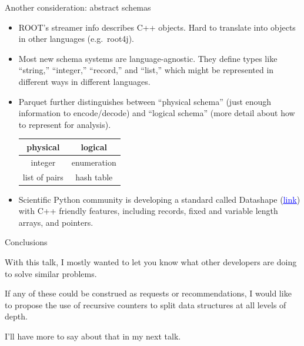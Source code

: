 \documentclass{beamer}
\begin{document}
\begin{frame}{Another consideration: abstract schemas}
\vspace{0.5 cm}
\begin{itemize}\setlength{\itemsep}{0.3 cm}
\item ROOT's streamer info describes C++ objects. Hard to translate into objects in other languages (e.g.\ root4j).

\item<2-> Most new schema systems are language-agnostic. They define types like ``string,'' ``integer,'' ``record,'' and ``list,'' which might be represented in different ways in different languages.

\item<3-> Parquet further distinguishes between ``physical schema'' (just enough information to encode/decode) and ``logical schema'' (more detail about how to represent for analysis).
\begin{center}
\begin{tabular}{c c}
physical & logical \\\hline
integer & enumeration \\
list of pairs & hash table \\
\end{tabular}
\end{center}

\item<4-> Scientific Python community is developing a standard called Datashape (\href{http://datashape.readthedocs.io/en/latest/overview.html}{\textcolor{blue}{\underline{link}}}) with C++ friendly features, including records, fixed and variable length arrays, and pointers.
\end{itemize}
\end{frame}

\begin{frame}{Conclusions}
\begin{block}{}
With this talk, I mostly wanted to let you know what other developers are doing to solve similar problems.
\end{block}

\begin{block}{}
If any of these could be construed as requests or recommendations, I would like to propose the use of recursive counters to split data structures at all levels of depth.
\end{block}

\begin{block}{}
I'll have more to say about that in my next talk.
\end{block}
\end{frame}
\end{document}
